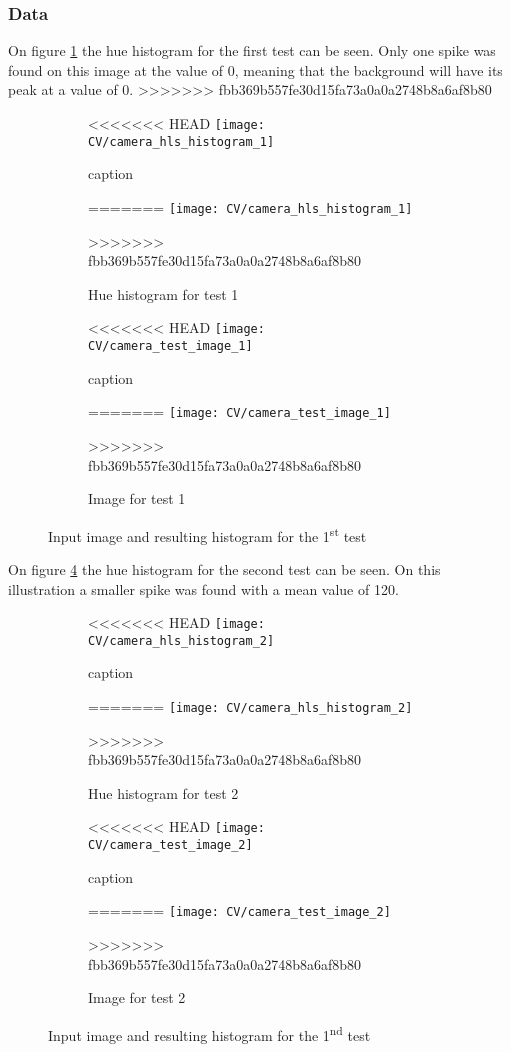 \documentclass[../Head/Main.tex]{subfiles}
\begin{document}
\subsubsection{Data}
On figure \ref{fig:hist_test_1} the hue histogram for the first test can be seen. Only one spike was found on this image at the value of 0, meaning that the background will have its peak at a value of 0. 
>>>>>>> fbb369b557fe30d15fa73a0a0a2748b8a6af8b80
\begin{figure}[H]
	\centering
	\begin{subfigure}[b]{0.48\textwidth}
		\centering
<<<<<<< HEAD
		\texttt{[image: CV/camera\_hls\_histogram\_1]}
		\caption{caption}
=======
		\texttt{[image: CV/camera\_hls\_histogram\_1]}
		\caption{Hue histogram for test 1}
		\label{fig:hist_test_1}
>>>>>>> fbb369b557fe30d15fa73a0a0a2748b8a6af8b80
	\end{subfigure}
	\hfill
	\begin{subfigure}[b]{0.5\textwidth}
		\centering
<<<<<<< HEAD
		\texttt{[image: CV/camera\_test\_image\_1]}
		\caption{caption}
=======
		\texttt{[image: CV/camera\_test\_image\_1]}
		\caption{Image for test 1}
		\label{fig:image_test_1}
>>>>>>> fbb369b557fe30d15fa73a0a0a2748b8a6af8b80
	\end{subfigure}
	\caption{Input image and resulting histogram for the 1\textsuperscript{st} test}
	\label{fig:test_1}
\end{figure}

On figure \ref{fig:hist_test_2} the hue histogram for the second test can be seen. On this illustration a smaller spike was found with a mean value of 120.
\begin{figure}[H]
	\centering
	\begin{subfigure}[b]{0.48\textwidth}
		\centering
<<<<<<< HEAD
		\texttt{[image: CV/camera\_hls\_histogram\_2]}
		\caption{caption}
=======
		\texttt{[image: CV/camera\_hls\_histogram\_2]}
		\caption{Hue histogram for test 2}
		\label{fig:hist_test_2}
>>>>>>> fbb369b557fe30d15fa73a0a0a2748b8a6af8b80
	\end{subfigure}
	\hfill
	\begin{subfigure}[b]{0.5\textwidth}
		\centering
<<<<<<< HEAD
		\texttt{[image: CV/camera\_test\_image\_2]}
		\caption{caption}
=======
		\texttt{[image: CV/camera\_test\_image\_2]}
		\caption{Image for test 2}
		\label{fig:image_test_2}
>>>>>>> fbb369b557fe30d15fa73a0a0a2748b8a6af8b80
	\end{subfigure}
	\caption{Input image and resulting histogram for the 1\textsuperscript{nd} test}
	\label{fig:test_2}
\end{figure}
\end{document}
